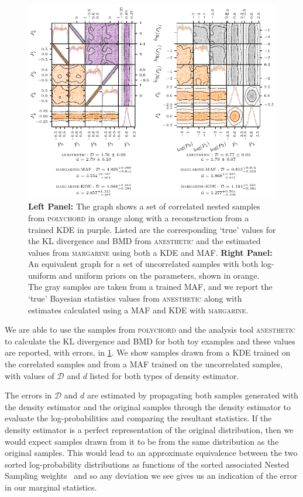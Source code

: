 \begin{figure}
    \centering
    \includegraphics[width=\linewidth]{margarine/figs/toy_examples_alt.pdf}
    \caption{\textbf{Left Panel:} The graph shows a set of correlated nested samples from \textsc{polychord} in orange along with a reconstruction from a trained KDE in purple. Listed are the corresponding `true' values for the KL divergence and BMD from \textsc{anesthetic} and the estimated values from \textsc{margarine} using both a KDE and MAF. \textbf{Right Panel:} An equivalent graph for a set of uncorrelated samples with both log-uniform and uniform priors on the parameters, shown in orange. The gray samples are taken from a trained MAF, and we report the `true' Bayesian statistics values from \textsc{anesthetic} along with estimates calculated using a MAF and KDE with \textsc{margarine}.}
    \label{fig:toy_example}
\end{figure}

We are able to use the samples from \textsc{polychord} and the analysis tool \textsc{anesthetic}~\cite{anesthetic} to calculate the KL divergence and BMD for both toy examples and these values are reported, with errors, in \cref{fig:toy_example}. We show samples drawn from a KDE trained on the correlated samples and from a MAF trained on the uncorrelated samples, with values of $\mathcal{D}$ and $d$ listed for both types of density estimator.

The errors in $\mathcal{D}$ and $d$ are estimated by propagating both samples generated with the density estimator and the original samples through the density estimator to evaluate the log-probabilities and comparing the resultant statistics. If the density estimator is a perfect representation of the original distribution, then we would expect samples drawn from it to be from the same distribution as the original samples. This would lead to an approximate equivalence between the two sorted log-probability distributions as functions of the sorted associated Nested Sampling weights~\cite{Harrison2015} and so any deviation we see gives us an indication of the error in our marginal statistics.

